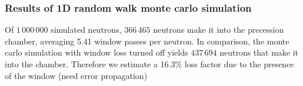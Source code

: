 \subsubsection{Results of 1D random walk monte carlo simulation}

Of $1\,000\,000$ simulated neutrons, $366\,465$ neutrons make it into the precession chamber, averaging 5.41 window passes per neutron. In comparison, the monte carlo simulation with window loss turned off yields $437\,694$ neutrons that make it into the chamber. Therefore we estimate a 16.3\% loss factor due to the presence of the window (need error propagation)